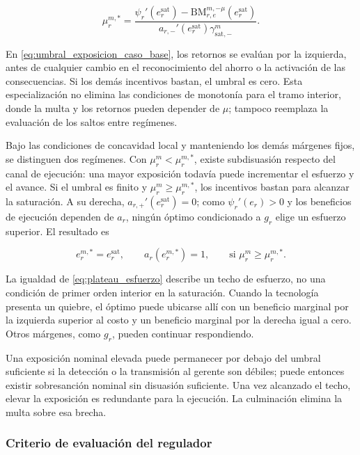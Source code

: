\begin{equation}
\label{eq:umbral_exposicion_caso_base}
\mu_r^{m,*}
=\frac{\psi_r'(e_r^{\mathrm{sat}})
-\mathrm{BM}_{r,e}^{m,-\mu}(e_r^{\mathrm{sat}})}
{a_{r,-}'(e_r^{\mathrm{sat}})\gamma_{\mathrm{sat},-}^m}.
\end{equation}

En \eqref{eq:umbral_exposicion_caso_base}, los retornos se evalúan por la izquierda, antes de cualquier cambio en el reconocimiento del ahorro o la activación de las consecuencias. Si los demás incentivos bastan, el umbral es cero. Esta especialización no elimina las condiciones de monotonía para el tramo interior, donde la multa y los retornos pueden depender de \(\mu\); tampoco reemplaza la evaluación de los saltos entre regímenes.

Bajo las condiciones de concavidad local y manteniendo los demás márgenes fijos, se distinguen dos regímenes. Con \(\mu_r^m<\mu_r^{m,*}\), existe subdisuasión respecto del canal de ejecución: una mayor exposición todavía puede incrementar el esfuerzo y el avance. Si el umbral es finito y \(\mu_r^m\geq\mu_r^{m,*}\), los incentivos bastan para alcanzar la saturación. A su derecha, \(a_{r,+}'(e_r^{\mathrm{sat}})=0\); como \(\psi_r'(e_r)>0\) y los beneficios de ejecución dependen de \(a_r\), ningún óptimo condicionado a \(g_r\) elige un esfuerzo superior. El resultado es

\begin{equation}
\label{eq:plateau_esfuerzo}
e_r^{m,*}
=
e_r^{\mathrm{sat}},
\qquad
a_r(e_r^{m,*})
=
1,
\qquad
\text{si }\mu_r^m\geq\mu_r^{m,*}.
\end{equation}

La igualdad de \eqref{eq:plateau_esfuerzo} describe un techo de esfuerzo, no una condición de primer orden interior en la saturación. Cuando la tecnología presenta un quiebre, el óptimo puede ubicarse allí con un beneficio marginal por la izquierda superior al costo y un beneficio marginal por la derecha igual a cero. Otros márgenes, como \(g_r\), pueden continuar respondiendo.

Una exposición nominal elevada puede permanecer por debajo del umbral suficiente si la detección o la transmisión al gerente son débiles; puede entonces existir sobresanción nominal sin disuasión suficiente. Una vez alcanzado el techo, elevar la exposición es redundante para la ejecución. La culminación elimina la multa sobre esa brecha.

\subsubsection{Criterio de evaluación del regulador}

